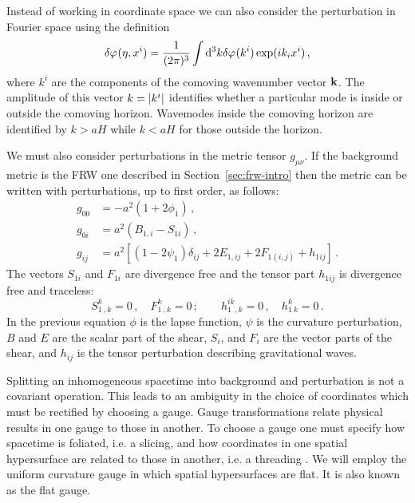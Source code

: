 Instead of working in coordinate space we can also consider
the perturbation in Fourier space using the definition
% 
\begin{equation}
\label{eq:fourierdefn-intro}
 \delta\varphi_{}(\eta, x^i) = \frac{1}{(2 \pi)^3} \int \mathrm{d}^3k \delta\varphi_{}(k^i) \exp (i k_i
x^i)
\,,
\end{equation}
where $k^i$ are the components of the comoving wavenumber vector $\bf{k}$. The
amplitude of this
vector $k=|k^i|$ identifies whether a particular mode is inside or outside
the comoving horizon. Wavemodes inside the comoving horizon are identified by
$k>aH$ while $k<aH$ for those outside the horizon. 


We must also consider perturbations in the metric tensor $g_{\mu\nu}$. If the
background metric is the FRW one described in Section~\ref{sec:frw-intro} then
the metric can be written with perturbations, up to first order, as follows:
% 
\begin{align}
 \label{eq:pertmetric-intro}
 g_{00} &= -a^2 (1 + 2\phi_1) \,, \nonumber\\
 g_{0i} &= a^2 (B_{1,i} - S_{1i}) \,, \nonumber\\
 g_{ij} &= a^2\left[ (1 - 2\psi_1)\delta_{ij} + 2E_{1,ij} + 2F_{1(i,j)} +
h_{1ij}
\right] \,.
\end{align}
% 
The vectors $S_{1i}$ and $F_{1i}$ are divergence free and the tensor part
$h_{1ij}$
is divergence free and traceless:
% 
\begin{equation}
 S^k_{1~,k} = 0\,, \quad F^k_{1~,k}=0\,; \qquad h^{ik}_{1~~,k} = 0\,,
  \quad h^k_{1~k}= 0\,.
\end{equation}
% 
In the previous equation $\phi$ is the lapse function, $\psi$ is the curvature
perturbation, $B$ and $E$ are the scalar part of the shear, $S_i$, and $F_i$
are the vector parts of the shear, and $h_{ij}$ is the tensor perturbation
describing gravitational waves.


Splitting an inhomogeneous spacetime into background and perturbation is not a
covariant operation. This leads to an ambiguity in the choice of coordinates
which must be rectified by choosing a gauge. Gauge transformations relate
physical results in one gauge to those in another. To choose a gauge one must
specify how spacetime is foliated, i.e. a slicing, and how coordinates in one
spatial hypersurface are related to those in another, i.e. a threading
\cite{Malik:2008im}. We will
employ the uniform curvature gauge in which spatial hypersurfaces are flat. It
is also known as the flat gauge.

